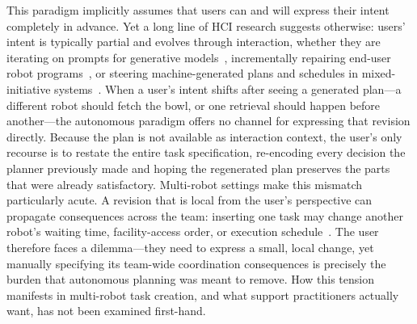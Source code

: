 This paradigm implicitly assumes that users can and will express their intent completely in advance.
Yet a long line of HCI research suggests otherwise: users' intent is typically partial and evolves through interaction, whether they are iterating on prompts for generative models~\cite{zamfirescu2023johnny, subramonyam2024bridging}, incrementally repairing end-user robot programs~\cite{kim2026robocritics}, or steering machine-generated plans and schedules in mixed-initiative systems~\cite{}. %
When a user's intent shifts after seeing a generated plan---a different robot should fetch the bowl, or one retrieval should happen before another---the autonomous paradigm offers no channel for expressing that revision directly.
Because the plan is not available as interaction context, the user's only recourse is to restate the entire task specification, re-encoding every decision the planner previously made and hoping the regenerated plan preserves the parts that were already satisfactory.
Multi-robot settings make this mismatch particularly acute.
A revision that is local from the user's perspective can propagate consequences across the team: inserting one task may change another robot's waiting time, facility-access order, or execution schedule~\cite{}.
The user therefore faces a dilemma---they need to express a small, local change, yet manually specifying its team-wide coordination consequences is precisely the burden that autonomous planning was meant to remove.
How this tension manifests in multi-robot task creation, and what support practitioners actually want, has not been examined first-hand.

